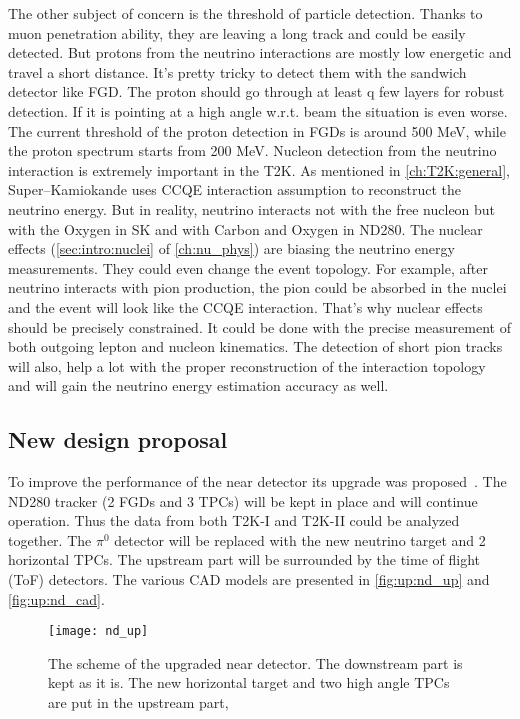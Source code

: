 \documentclass[../main.tex]{subfiles}
\begin{document}
The other subject of concern is the threshold of particle detection. Thanks to muon penetration ability, they are leaving a long track and could be easily detected. But protons from the neutrino interactions are mostly low energetic and travel a short distance. It's pretty tricky to detect them with the sandwich detector like FGD. The proton should go through at least q few layers for robust detection. If it is pointing at a high angle w.r.t. beam the situation is even worse. The current threshold of the proton detection in FGDs is around 500 MeV, while the proton spectrum starts from 200 MeV. Nucleon detection from the neutrino interaction is extremely important in the T2K. As mentioned in \autoref{ch:T2K:general}, Super--Kamiokande uses CCQE interaction assumption to reconstruct the neutrino energy. But in reality, neutrino interacts not with the free nucleon but with the Oxygen in SK and with Carbon and Oxygen in ND280. The nuclear effects (\autoref{sec:intro:nuclei} of \autoref{ch:nu_phys}) are biasing the neutrino energy measurements. They could even change the event topology. For example, after neutrino interacts with pion production, the pion could be absorbed in the nuclei and the event will look like the CCQE interaction. That's why nuclear effects should be precisely constrained. It could be done with the precise measurement of both outgoing lepton and nucleon kinematics. The detection of short pion tracks will also, help a lot with the proper reconstruction of the interaction topology and will gain the neutrino energy estimation accuracy as well.

\subsection{New design proposal}

To improve the performance of the near detector its upgrade was proposed~\cite{Abe2019}. The ND280 tracker (2 FGDs and 3 TPCs) will be kept in place and will continue operation. Thus the data from both T2K-I and T2K-II could be analyzed together. The $\pi^0$ detector will be replaced with the new neutrino target and 2 horizontal TPCs. The upstream part will be surrounded by the time of flight (ToF) detectors. The various CAD models are presented in \autoref{fig:up:nd_up} and \autoref{fig:up:nd_cad}.

\begin{figure}[!ht]
  \centering
  \texttt{[image: nd\_up]}
  \caption{The scheme of the upgraded near detector. The downstream part is kept as it is. The new horizontal target and two high angle TPCs are put in the upstream part,}
  \label{fig:up:nd_up}
\end{figure}
\end{document}
